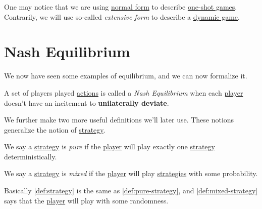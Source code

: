 \begin{note}
	One may notice that we are using \href{https://en.wikipedia.org/wiki/Normal-form_game}{normal form} to describe \hyperref[def:one-shot-game]{one-shot games}.
	Contrarily, we will use so-called \emph{extensive form} to describe a \hyperref[def:dynamic-game]{dynamic game}.
\end{note}

\section{Nash Equilibrium}
We now have seen some examples of equilibrium, and we can now formalize it.
\begin{definition}\label{def:Nash-equilibrium}
	A set of players played \hyperref[def:strategy]{actions} is called a \emph{Nash Equilibrium}
	when each \hyperref[def:player]{player} doesn't have an incitement to \textbf{unilaterally deviate}.
\end{definition}

We further make two more useful definitions we'll later use. These notions generalize the notion of \hyperref[def:strategy]{strategy}.

\begin{definition}\label{def:pure-strategy}
	We say a \hyperref[def:strategy]{strategy} is \emph{pure} if the \hyperref[def:player]{player} will play exactly one \hyperref[def:strategy]{strategy} deterministically.
\end{definition}

\begin{definition}\label{def:mixed-strategy}
	We say a \hyperref[def:strategy]{strategy} is \emph{mixed} if the \hyperref[def:player]{player} will play \hyperref[def:strategy]{strategies} with some probability.
\end{definition}
\begin{intuition}
	Basically \autoref{def:strategy} is the same as \autoref{def:pure-strategy}, and \autoref{def:mixed-strategy} says that the \hyperref[def:player]{player} will
	play with some randomness.
\end{intuition}

